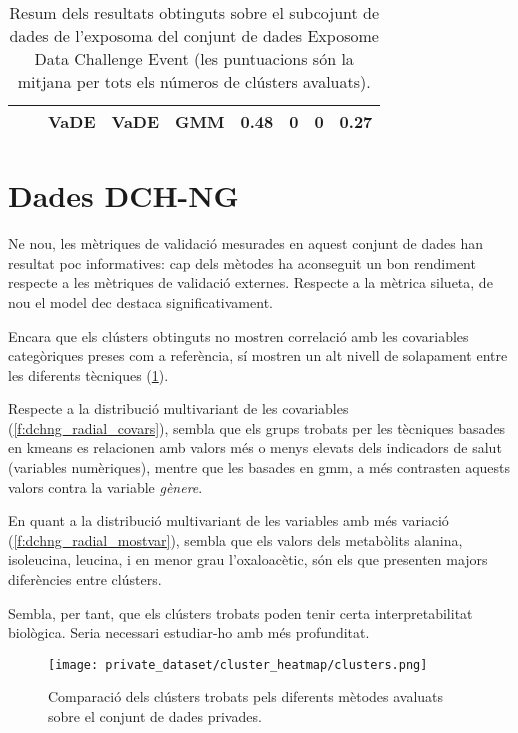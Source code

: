 \documentclass[CAT,BIB]{TFUOC}%
\begin{document}
\begin{table}[p]
\begin{tabular}{@{}ccccccccc@{}}
                &  & VaDE & VaDE & GMM & 0.48 & 0 & 0 & 0.27 \\ \bottomrule
            \end{tabular}
            \caption[Exposome Data Challenge Event: resultats (exposoma)]{
                Resum dels resultats obtinguts sobre el subcojunt de dades de l'exposoma
                del conjunt de dades Exposome Data Challenge Event
                (les puntuacions són la mitjana per tots els números de clústers avaluats).}
            \label{t:exposome_results}
        \end{table}

    \section{Dades DCH-NG}
    \label{s:results_privades}

        Ne nou, les mètriques de validació mesurades en aquest conjunt de dades
        han resultat poc informatives:
        cap dels mètodes ha aconseguit un bon rendiment
        respecte a les mètriques de validació externes.
        Respecte a la mètrica silueta,
        de nou el model \gls{dec} destaca significativament.

        Encara que els clústers obtinguts no mostren correlació
        amb les covariables categòriques preses com a referència,
        sí mostren un alt nivell de solapament
        entre les diferents tècniques (\cref{f:dchng_heatmap}).

        Respecte a la distribució multivariant de les covariables (\cref{f:dchng_radial_covars}),
        sembla que els grups trobats per les tècniques
        basades en \gls{kmeans} es relacionen amb valors més o menys elevats dels indicadors de salut
        (variables numèriques),
        mentre que les basades en \gls{gmm},
        a més contrasten aquests valors contra la variable \textit{gènere}.

        En quant a la distribució multivariant de les variables amb més variació
        (\cref{f:dchng_radial_mostvar}),
        sembla que els valors dels metabòlits alanina, isoleucina, leucina,
        i en menor grau l'oxaloacètic,
        són els que presenten majors diferències entre clústers.

        Sembla, per tant, que els clústers trobats poden tenir certa interpretabilitat biològica.
        Seria necessari estudiar-ho amb més profunditat.



        \begin{figure}[p]
            \centering
            \texttt{[image: private\_dataset/cluster\_heatmap/clusters.png]}
            \caption[Comparació dels clústers pel conjunt de dades \gls{privades}]{
                Comparació dels clústers trobats pels diferents mètodes avaluats
                sobre el conjunt de dades \gls{privades}.
            }
            \label{f:dchng_heatmap}
        \end{figure}
\end{document}
